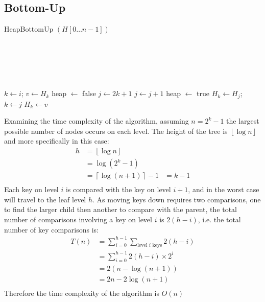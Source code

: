 \documentclass[12pt letter]{report}
\begin{document}
\subsection{Bottom-Up}
\begin{algorithm}[H]
  \caption{HeapBottomUp $ \left( H \left[ 0\ldots n-1 \right]  \right) $}
  \Comment{}\\
   \\
   \\
   \\
  \begin{algorithmic}[1]
    \State $k \gets i$; $v \gets H_k$
    \State heap $ \gets $ false
    \State $j \gets 2k + 1$
     $j \gets j + 1$
    \EndIf
    \EndIf
    \State heap $ \gets $ true
    \Else
    \State $H_k \gets H_j$; $k \gets j$
    \EndIf
    \EndWhile
    \State $H_k \gets v$
    \EndFor
  \end{algorithmic}
\end{algorithm}
Examining the time complexity of the algorithm, assuming $n = 2^{k} - 1$ the largest possible number of nodes occurs on
each level. The height of the tree is $\left\lfloor \log n \right\rfloor$ and more specifically in this case:
\begin{align*}
  h & = \left\lfloor \log n \right\rfloor                       \\
    & = \log \left( 2^{k} - 1 \right)                           \\
    & = \left\lceil \log \left( n + 1 \right)  \right\rceil - 1
    & = k - 1                                                   \\
\end{align*}
Each key on level $i$ is compared with the key on level $i + 1$, and in the worst case will travel to the leaf level
$h$. As moving keys down requires two comparisons, one to find the larger child then another to compare with the parent,
the total number of comparisons involving a key on level $i$ is $2 \left( h - i \right) $, i.e. the total number of key
comparisons is:
\begin{align*}
  T \left( n \right) & = \displaystyle\sum_{i = 0}^{h - 1} \displaystyle\sum_{ \text{level $i$ keys}} 2 \left( h - i \right) \\
                     & = \displaystyle\sum_{i = 0}^{h - 1} 2 \left( h - i \right) \times 2^{i}                               \\
                     & = 2 \left( n - \log \left( n + 1 \right)  \right)                                                     \\
                     & = 2n - 2\log \left( n + 1 \right)                                                                     \\
\end{align*}
Therefore the time complexity of the algorithm is $O(n)$
\end{document}
